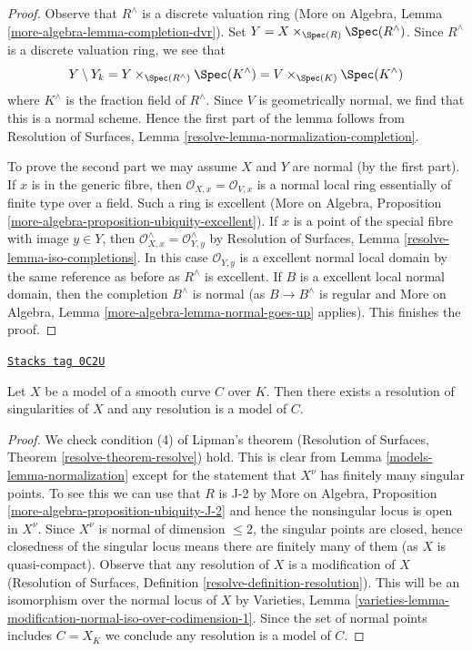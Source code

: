 \begin{proof}
Observe that $R^\wedge$ is a discrete valuation ring
(More on Algebra, Lemma \ref{more-algebra-lemma-completion-dvr}).
Set $Y = X \times_{\Spec(R)} \Spec(R^\wedge)$.
Since $R^\wedge$ is a discrete valuation ring, we see that
$$
Y \setminus Y_k =
Y \times_{\Spec(R^\wedge)} \Spec(K^\wedge) =
V \times_{\Spec(K)} \Spec(K^\wedge)
$$
where $K^\wedge$ is the fraction field of $R^\wedge$.
Since $V$ is geometrically normal, we find that this is
a normal scheme. Hence the first part of the lemma follows from
Resolution of Surfaces, Lemma \ref{resolve-lemma-normalization-completion}.

\medskip\noindent
To prove the second part we may assume $X$ and $Y$ are normal
(by the first part). If $x$ is in the generic fibre, then
$\mathcal{O}_{X, x} = \mathcal{O}_{V, x}$ is a normal local
ring essentially of finite type over a field. Such a ring is
excellent (More on Algebra, Proposition
\ref{more-algebra-proposition-ubiquity-excellent}).
If $x$ is a point of the special fibre with image $y \in Y$, then
$\mathcal{O}_{X, x}^\wedge = \mathcal{O}_{Y, y}^\wedge$
by Resolution of Surfaces, Lemma \ref{resolve-lemma-iso-completions}.
In this case $\mathcal{O}_{Y, y}$ is a excellent normal local domain
by the same reference as before as $R^\wedge$ is excellent.
If $B$ is a excellent local normal domain, then the completion
$B^\wedge$ is normal (as $B \to B^\wedge$ is regular and
More on Algebra, Lemma \ref{more-algebra-lemma-normal-goes-up} applies).
This finishes the proof.
\end{proof}

\begin{lemma}[Regular]
\label{models-lemma-regular}
\href{https://stacks.math.columbia.edu/tag/0C2U}{\texttt{Stacks tag 0C2U}}

Let $X$ be a model of a smooth curve $C$ over $K$. Then
there exists a resolution of singularities of $X$
and any resolution is a model of $C$.
\end{lemma}

\begin{proof}

We check condition (4) of Lipman's theorem
(Resolution of Surfaces, Theorem \ref{resolve-theorem-resolve}) hold.
This is clear from Lemma \ref{models-lemma-normalization}
except for the statement that $X^\nu$ has finitely many
singular points. To see this we can use that $R$ is J-2 by
More on Algebra, Proposition \ref{more-algebra-proposition-ubiquity-J-2}
and hence the nonsingular locus is open in $X^\nu$.
Since $X^\nu$ is normal of dimension $\leq 2$, the singular points
are closed, hence closedness of the singular locus
means there are finitely many of them (as $X$ is quasi-compact).
Observe that any resolution of $X$ is a modification of $X$
(Resolution of Surfaces, Definition \ref{resolve-definition-resolution}).
This will be an isomorphism over the normal locus of $X$ by Varieties, Lemma
\ref{varieties-lemma-modification-normal-iso-over-codimension-1}.
Since the set of normal points includes
$C = X_K$ we conclude any resolution is a model of $C$.
\end{proof}

